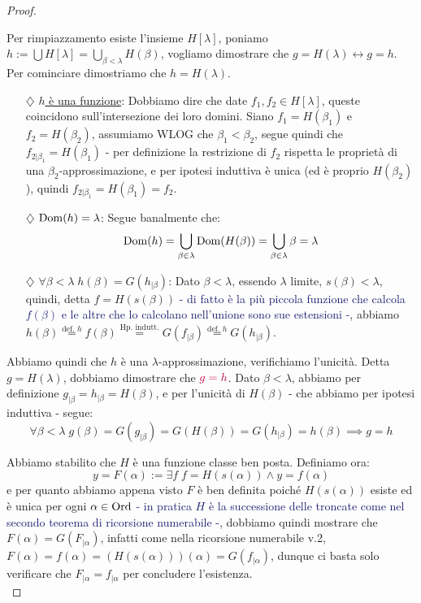 \begin{proof}
\begin{itemize}
		Per rimpiazzamento esiste l'insieme $H[\lambda]$, poniamo $h := \bigcup H[\lambda] = \bigcup_{\beta < \lambda} H(\beta)$, vogliamo dimostrare che $g = H(\lambda) \leftrightarrow g = h$. Per cominciare dimostriamo che $h = H(\lambda)$.
		\begin{itemize}
			\item[$\diamondsuit$] \underline{$h$ è una funzione}: Dobbiamo dire che date $f_1,f_2 \in H[\lambda]$, queste coincidono sull'intersezione dei loro domini. Siano $f_1 = H(\beta_1)$ e $f_2 = H(\beta_2)$,
			assumiamo WLOG che $\beta_1 < \beta_2$, segue quindi che $f_{2|\beta_1} = H(\beta_1)$ - per definizione la restrizione di $f_2$ rispetta le proprietà di una $\beta_2$-approssimazione, e per ipotesi induttiva è unica (ed è proprio $H(\beta_2)$), quindi $f_{2|\beta_1} = H(\beta_1) = f_2 $.
			\item[$\diamondsuit$] \underline{$\operatorname{Dom}(h) = \lambda$}: Segue banalmente che:
			\[ \operatorname{Dom}(h) = \bigcup_{\beta \in \lambda} \operatorname{Dom}(H(\beta)) = \bigcup_{\beta \in \lambda} \beta = \lambda
				\]
			\item[$\diamondsuit$] \underline{$\forall \beta < \lambda \; h(\beta) = G(h_{|\beta})$}: Dato $\beta < \lambda$, essendo $\lambda$ limite, $s(\beta) < \lambda$, quindi, detta $f = H(s(\beta))$ \textcolor{MidnightBlue}{- di fatto è la più piccola funzione che calcola $f(\beta)$ e le altre che lo calcolano nell'unione 
			sono sue estensioni -}, abbiamo $h(\beta) \overset{\text{def. $h$}}{=} f(\beta) \overset{\text{Hp. indutt.}}{=} G(f_{|\beta}) \overset{\text{def. $h$}}{=} G(h_{|\beta})$.
		\end{itemize}
		Abbiamo quindi che $h$ è una $\lambda$-approssimazione, verifichiamo l'unicità. Detta $g = H(\lambda)$, dobbiamo dimostrare che $\textcolor{purple}{g = h}$.
		Dato $\beta < \lambda$, abbiamo per definizione $g_{|\beta} = h_{|\beta} = H(\beta)$, e per l'unicità di $H(\beta)$ - che abbiamo per ipotesi induttiva - segue:
		\[ \forall \beta < \lambda \; g(\beta) = G(g_{|\beta}) = G(H(\beta)) = G(h_{|\beta}) = h(\beta) \implies g = h
			\]
	\end{itemize}
	Abbiamo stabilito che $H$ è una funzione classe ben posta. Definiamo ora:
	\[ y = F(\alpha) := \exists f \; f = H(s(\alpha)) \land y = f(\alpha)
		\]
	e per quanto abbiamo appena visto $F$ è ben definita poiché $H(s(\alpha))$ esiste ed è unica per ogni $\alpha \in \operatorname{Ord}$ \textcolor{MidnightBlue}{- in pratica $H$ è la successione delle troncate come nel secondo teorema di ricorsione numerabile -},
	dobbiamo quindi mostrare che $F(\alpha) = G(F_{|\alpha})$, infatti come nella ricorsione numerabile v.2, $F(\alpha) = f(\alpha) = (H(s(\alpha)))(\alpha) = G(f_{|\alpha})$, dunque ci basta solo verificare che $F_{|\alpha} = f_{|\alpha}$ per concludere l'esistenza.\\

\end{proof}
